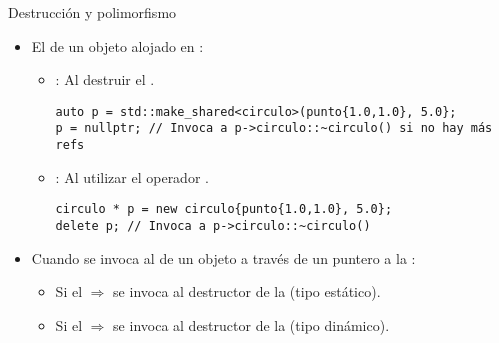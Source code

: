 \begin{frame}[t,fragile]{Destrucción y polimorfismo}
\begin{itemize}
  \item El  de un objeto alojado 
        en  :
    \begin{itemize}
      \item {}: Al destruir el .
\begin{lstlisting}
auto p = std::make_shared<circulo>(punto{1.0,1.0}, 5.0};
p = nullptr; // Invoca a p->circulo::~circulo() si no hay más refs
\end{lstlisting}
      \item {}: Al utilizar el operador .
\begin{lstlisting}
circulo * p = new circulo{punto{1.0,1.0}, 5.0};
delete p; // Invoca a p->circulo::~circulo()
\end{lstlisting}
    \end{itemize}

  \item Cuando se invoca al  de un objeto 
        a través de un puntero a la :
    \begin{itemize}
      \item Si el   $\Rightarrow$ 
            se invoca al destructor de la  (tipo estático).
      \item Si el   $\Rightarrow$ 
            se invoca al destructor de la  (tipo dinámico).
    \end{itemize}
\end{itemize}
\end{frame}

